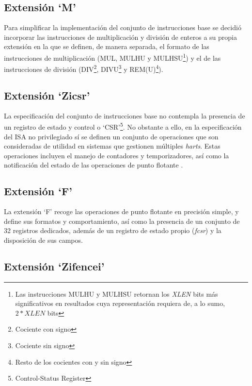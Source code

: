\subsection{Extensión `M'}

Para simplificar la implementación del conjunto de instrucciones base se decidió incorporar las instrucciones de multiplicación y división de enteros a su propia extensión en la que se definen, de manera separada, el formato de las instrucciones de multiplicación (MUL, MULHU y MULHSU\footnote{Las instrucciones MULHU y MULHSU retornan los \textit{XLEN} bits más significativos en resultados cuya representación requiera de, a lo sumo, \(2 * XLEN\) bits}) y el de las instrucciones de división (DIV\footnote{Cociente con signo}, DIVU\footnote{Cociente sin signo} y REM(U)\footnote{Resto de los cocientes con y sin signo}).

\subsection{Extensión `Zicsr'}

La especificación del conjunto de instrucciones base no contempla la presencia de un registro de estado y control o `CSR'\footnote{Control-Status Register}. No obstante a ello, en la especificación del ISA no privilegiado sí se definen un conjunto de operaciones que son consideradas de utilidad en sistemas que gestionen múltiples \textit{harts}. Estas operaciones incluyen el manejo de contadores y temporizadores, así como la notificación del estado de las operaciones de punto flotante \cite{riscv-unpriv-isa-20250508-zicsr}.

\subsection{Extensión `F'}

La extensión `F' recoge las operaciones de punto flotante en precisión simple, y define sus formatos y comportamiento, así como la presencia de un conjunto de 32 registros dedicados, además de un registro de estado propio (\textit{fcsr}) y la disposición de sus campos.

\subsection{Extensión `Zifencei'}

